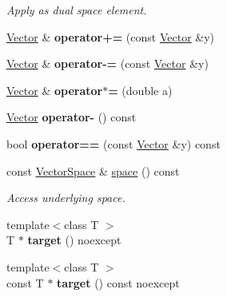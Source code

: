 \begin{DoxyCompactItemize}
\begin{DoxyCompactList}\small\item\em Apply as dual space element. \end{DoxyCompactList}\item 
\hypertarget{classSpacy_1_1Vector_a6d5770a3bd58db532e79b16f2526c275}{\hyperlink{classSpacy_1_1Vector}{Vector} \& {\bfseries operator+=} (const \hyperlink{classSpacy_1_1Vector}{Vector} \&y)}\label{classSpacy_1_1Vector_a6d5770a3bd58db532e79b16f2526c275}

\item 
\hypertarget{classSpacy_1_1Vector_afbebc56400ed2e281815fee88b78b3f6}{\hyperlink{classSpacy_1_1Vector}{Vector} \& {\bfseries operator-\/=} (const \hyperlink{classSpacy_1_1Vector}{Vector} \&y)}\label{classSpacy_1_1Vector_afbebc56400ed2e281815fee88b78b3f6}

\item 
\hypertarget{classSpacy_1_1Vector_a06a3538f752f001b289c2f690357e1e7}{\hyperlink{classSpacy_1_1Vector}{Vector} \& {\bfseries operator$\ast$=} (double a)}\label{classSpacy_1_1Vector_a06a3538f752f001b289c2f690357e1e7}

\item 
\hypertarget{classSpacy_1_1Vector_a050dba43b304fdf5f15141d25465be56}{\hyperlink{classSpacy_1_1Vector}{Vector} {\bfseries operator-\/} () const }\label{classSpacy_1_1Vector_a050dba43b304fdf5f15141d25465be56}

\item 
\hypertarget{classSpacy_1_1Vector_a0d634e69572e8da07c3c7056ec911208}{bool {\bfseries operator==} (const \hyperlink{classSpacy_1_1Vector}{Vector} \&y) const }\label{classSpacy_1_1Vector_a0d634e69572e8da07c3c7056ec911208}

\item 
\hypertarget{classSpacy_1_1Vector_a8a549d4ed045ddf563afca5bc942397b}{const \hyperlink{classSpacy_1_1VectorSpace}{Vector\-Space} \& \hyperlink{classSpacy_1_1Vector_a8a549d4ed045ddf563afca5bc942397b}{space} () const }\label{classSpacy_1_1Vector_a8a549d4ed045ddf563afca5bc942397b}

\begin{DoxyCompactList}\small\item\em Access underlying space. \end{DoxyCompactList}\item 
\hypertarget{classSpacy_1_1Vector_ace5b6585249e3f37cacdc92e3d974623}{{\footnotesize template$<$class T $>$ }\\T $\ast$ {\bfseries target} () noexcept}\label{classSpacy_1_1Vector_ace5b6585249e3f37cacdc92e3d974623}

\item 
\hypertarget{classSpacy_1_1Vector_a32cd1f62131a09d7893a03dd1039abe9}{{\footnotesize template$<$class T $>$ }\\const T $\ast$ {\bfseries target} () const noexcept}\label{classSpacy_1_1Vector_a32cd1f62131a09d7893a03dd1039abe9}

\end{DoxyCompactItemize}


